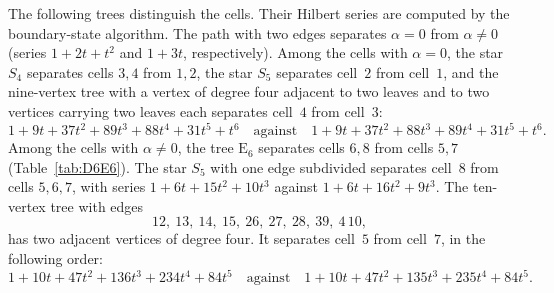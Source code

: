 \documentclass[reqno]{article}
\theoremstyle{plain} %
\theoremstyle{definition}
\theoremstyle{remark}
\numberwithin{equation}{section}
\begin{document}
The following trees distinguish the cells. Their Hilbert series are
computed by the boundary-state algorithm. The path with two edges separates
$\alpha=0$ from $\alpha\ne0$ (series $1+2t+t^2$ and $1+3t$, respectively).
Among the cells with $\alpha=0$, the star $S_4$ separates cells $3,4$ from
$1,2$, the star $S_5$ separates cell~$2$ from cell~$1$, and the
nine-vertex tree with a vertex of degree four adjacent to two leaves and
to two vertices carrying two leaves each separates cell~$4$ from cell~$3$:
\[
1+9t+37t^2+89t^3+88t^4+31t^5+t^6\quad\text{against}\quad
1+9t+37t^2+88t^3+89t^4+31t^5+t^6.
\]
Among the cells with $\alpha\ne0$, the tree $\mathrm E_6$ separates cells $6,8$
from cells $5,7$ (Table~\ref{tab:D6E6}). The star $S_5$ with one edge
subdivided separates cell~$8$ from cells $5,6,7$, with series
$1+6t+15t^2+10t^3$ against $1+6t+16t^2+9t^3$. The ten-vertex tree with edges
\[
12,\ 13,\ 14,\ 15,\ 26,\ 27,\ 28,\ 39,\ 4\,10,
\]
has two adjacent vertices of degree four. It separates cell~$5$ from
cell~$7$, in the following order:
\[
1+10t+47t^2+136t^3+234t^4+84t^5\quad\text{against}\quad
1+10t+47t^2+135t^3+235t^4+84t^5.
\]
\end{document}
